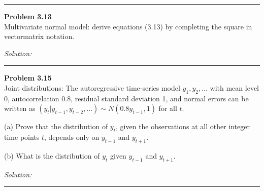 \documentclass[a4paper, 11pt]{article}
\newenvironment{problem}[2][Problem]
    { \begin{mdframed}[backgroundcolor=gray!20] \textbf{#1 #2} \\}
    {  \end{mdframed}}
\newenvironment{solution}
    {\textit{Solution:}}
    {}
\begin{document}
\noindent\rule{7in}{2.8pt}
\begin{problem}{3.13}
Multivariate normal model: derive equations (3.13) by completing the square in vectormatrix notation.
\end{problem}
\begin{solution}

\end{solution}

\noindent\rule{7in}{2.8pt}
\begin{problem}{3.15}
Joint distributions: The autoregressive time-series model $y_1, y_2,\dots$ with mean level 0, autocorrelation 0.8, residual standard deviation 
1, and normal errors can be written as $(y_t|y_{t-1},y_{t-2},\dots) \sim N(0.8y_{t-1}, 1)$ for all $t$.

(a) Prove that the distribution of $y_t$, given the observations at all other integer time points $t$, depends only on $y_{t-1}$ and $y_{t+1}$.

(b) What is the distribution of $y_t$ given $y_{t-1}$ and $y_{t+1}$.
\end{problem}
\begin{solution}

\end{solution}

\noindent\rule{7in}{2.8pt}

\end{document}
